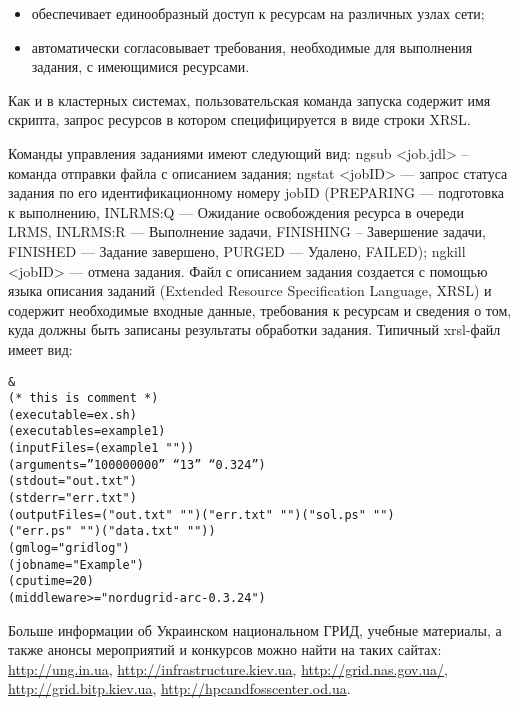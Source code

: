 \documentclass[10pt, a5paper]{article}
\begin{document}
\begin{itemize}
  \item обеспечивает единообразный доступ к ресурсам на различных узлах сети;
  \item автоматически согласовывает требования, необходимые для выполнения задания, с имеющимися ресурсами.
\end{itemize}

Как и в кластерных системах, пользовательская команда запуска содержит имя скрипта, запрос ресурсов в котором специфицируется в виде строки XRSL.

Команды управления заданиями имеют следующий вид: ngsub <job.jdl> -- команда отправки файла с описанием задания; ngstat <jobID> --- запрос статуса задания по его идентификационному номеру jobID (PREPARING --- подготовка к выполнению, INLRMS:Q --- Ожидание освобождения ресурса в очереди LRMS, INLRMS:R --- Выполнение задачи, FINISHING – Завершение задачи, FINISHED --- Задание завершено, PURGED --- Удалено, FAILED); ngkill <jobID> --- отмена задания.
Файл с описанием задания создается с помощью языка описания заданий (Extended Resource Specification Language, XRSL) и содержит необходимые входные данные, требования к ресурсам и сведения о том, куда должны быть записаны результаты обработки задания. Типичный xrsl-файл имеет вид:

\begin{verbatim}
&
(* this is comment *)
(executable=ex.sh)
(executables=example1)
(inputFiles=(example1 ""))
(arguments=”100000000” “13” “0.324”)
(stdout="out.txt")
(stderr="err.txt")
(outputFiles=("out.txt" "")("err.txt" "")("sol.ps" "")
("err.ps" "")("data.txt" ""))
(gmlog="gridlog")
(jobname="Example")
(cputime=20)
(middleware>="nordugrid-arc-0.3.24")
\end{verbatim}

Больше информации об Украинском национальном ГРИД, учебные материалы, а также анонсы мероприятий и конкурсов можно найти на таких сайтах: \url{http://ung.in.ua}, \url{http://infrastructure.kiev.ua}, \url{http://grid.nas.gov.ua/}, \url{http://grid.bitp.kiev.ua}, \linebreak \url{http://hpcandfosscenter.od.ua}.
\end{document}
